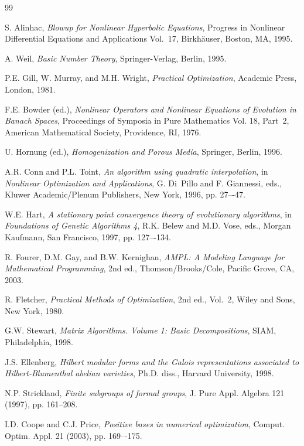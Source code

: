 \documentclass[]{interact}
\theoremstyle{plain}%
\theoremstyle{definition}
\theoremstyle{remark}
\begin{document}
\begin{thebibliography}{99}

S. Alinhac, \emph{Blowup for Nonlinear Hyperbolic Equations}, Progress in
  Nonlinear Differential Equations and Applications Vol.~17, Birkh{\"a}user,
  Boston, MA, 1995.

A. Weil, \emph{Basic Number Theory}, Springer-Verlag, Berlin, 1995.

P.E. Gill, W. Murray, and M.H. Wright, \emph{Practical Optimization}, Academic
  Press, London, 1981.

F.E. Bowder (ed.), \emph{Nonlinear Operators and Nonlinear Equations of
  Evolution in Banach Spaces}, Proceedings of Symposia in Pure Mathematics
  Vol. 18, Part~2, American Mathematical Society, Providence, RI, 1976.

U. Hornung (ed.), \emph{Homogenization and Porous Media}, Springer, Berlin,
  1996.

A.R. Conn and P.L. Toint, \emph{An algorithm using quadratic interpolation}, in
  \emph{Nonlinear Optimization and Applications}, G. Di~Pillo and F. Giannessi,
  eds., Kluwer Academic/Plenum Publishers, New York, 1996, pp. 27–-47.

W.E. Hart, \emph{A stationary point convergence theory of evolutionary
  algorithms}, in \emph{Foundations of Genetic Algorithms 4}, R.K. Belew and
  M.D. Vose, eds., Morgan Kaufmann, San Francisco, 1997, pp. 127–-134.

R. Fourer, D.M. Gay, and B.W. Kernighan, \emph{AMPL: A Modeling Language for
  Mathematical Programming}, 2nd ed., Thomson/Brooks/Cole, Pacific Grove, CA,
  2003.

R. Fletcher, \emph{Practical Methods of Optimization}, 2nd ed., Vol.~2, Wiley
  and Sons, New York, 1980.

G.W. Stewart, \emph{Matrix Algorithms. Volume 1: Basic Decompositions}, SIAM,
  Philadelphia, 1998.

J.S. Ellenberg, \emph{Hilbert modular forms and the Galois representations
  associated to Hilbert-Blumenthal abelian varieties}, Ph.D. diss., Harvard
  University, 1998.

N.P. Strickland, \emph{Finite subgroups of formal groups}, J. Pure Appl.
  Algebra 121 (1997), pp. 161--208.

I.D. Coope and C.J. Price, \emph{Positive bases in numerical optimization},
  Comput. Optim. Appl. 21 (2003), pp. 169–-175.


\end{thebibliography}
\end{document}
